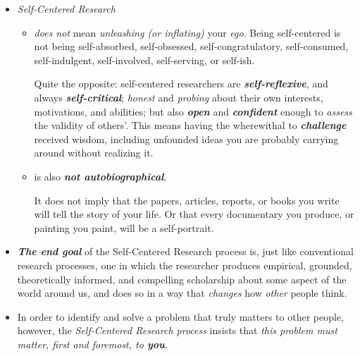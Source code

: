\documentclass[11pt]{article}
\begin{document}
\begin{itemize}
\item \emph{Self-Centered Research} 
\begin{itemize}
\item \emph{does not} mean \emph{unleashing (or inflating)} your \emph{ego}. Being self-centered is not being self-absorbed, self-obsessed, self-congratulatory, self-consumed, self-indulgent, self-involved, self-serving, or self-ish.

Quite the opposite: self-centered researchers are \emph{\textbf{self-reflexive}}, and always \emph{\textbf{self-critical}}; \emph{honest} and \emph{probing} about their own interests, motivations, and abilities; but also \emph{\textbf{open}} and \emph{\textbf{confident}} enough to \emph{assess} the validity of others’. This means having the wherewithal to \emph{\textbf{challenge}} received wisdom, including unfounded ideas you are probably carrying around without realizing it.

\item is also \emph{\textbf{not autobiographical}}.

It does not imply that the papers, articles, reports, or books you write will tell the story of your life. Or that every documentary you produce, or painting you paint, will be a self-portrait.
\end{itemize}

\item \emph{\textbf{The end goal}} of the Self-Centered Research process is, just like conventional research processes, one in which the researcher produces empirical, grounded, theoretically informed, and compelling scholarship about some aspect of the world around us, and does so in a way that \emph{changes} how \emph{other} people think. 

\item In order to identify and solve a problem that truly matters to other people, however, the \emph{Self-Centered Research process} insists that \emph{this problem must matter, first and foremost, to \textbf{you}}.
\end{itemize}
\end{document}

